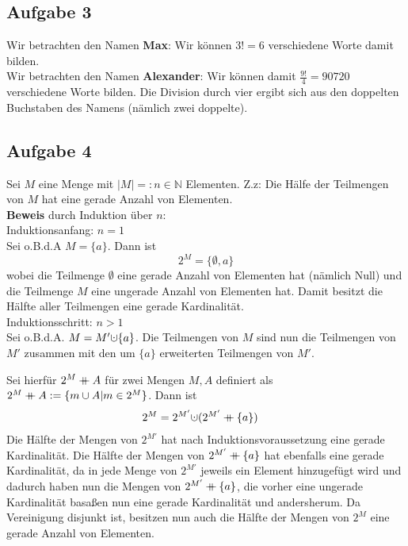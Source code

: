 \documentclass[11pt,a4paper,ngerman]{article}
\newcommand\mdoubleplus{\ensuremath{\mathbin{+\mkern-10mu+}}}
\begin{document}
\subsection*{Aufgabe 3}

Wir betrachten den Namen \textbf{Max}: Wir können $3! = 6$ verschiedene Worte damit bilden.\\
Wir betrachten den Namen \textbf{Alexander}: Wir können damit $\frac{9!}{4} = 90720$ verschiedene Worte bilden. Die Division durch vier ergibt sich aus den doppelten Buchstaben des Namens (nämlich zwei doppelte).

\subsection*{Aufgabe 4}
Sei $M$ eine Menge mit $|M| =: n \in \mathbb{N}$ Elementen. Z.z: Die Hälfe der Teilmengen von $M$ hat eine gerade Anzahl von Elementen. \\
\textbf{Beweis} durch Induktion über $n$: \\
  Induktionsanfang: $n = 1$ \\
        Sei o.B.d.A $M = \{ a \}$. Dann ist
        \begin{equation*}
          2^M = \{\emptyset, {a} \}
        \end{equation*}
        wobei die Teilmenge $\emptyset$ eine gerade Anzahl von Elementen hat (nämlich Null) und
        die Teilmenge $M$ eine ungerade Anzahl von Elementen hat. Damit besitzt die Hälfte aller
        Teilmengen eine gerade Kardinalität. \\
        Induktionsschritt: $n > 1$ \\
        Sei o.B.d.A. $M = M' \mathaccent\cdot\cup \{ a \}$.
        Die Teilmengen von $M$ sind nun die Teilmengen von $M'$ zusammen mit den um $\{a\}$ 
        erweiterten Teilmengen von $M'$.
        
        Sei hierfür $2^M \mdoubleplus A$ für zwei Mengen $M,A$ definiert als
        $2^M \mdoubleplus A := \{m \cup A | m \in 2^M\} $. Dann ist
        \begin{equation*}\begin{split}
          2^M &= 2^{M'} \mathaccent\cdot\cup (2^{M'} \mdoubleplus \{a\})
        \end{split}\end{equation*}
        Die Hälfte der Mengen von $2^{M'}$ hat nach Induktionsvoraussetzung eine gerade
        Kardinalität. Die Hälfte der Mengen von $2^{M'} \mdoubleplus \{a\}$ hat ebenfalls
        eine gerade Kardinalität, da in jede Menge von $2^{M'}$ jeweils ein Element hinzugefügt
        wird und dadurch haben nun die Mengen von $2^{M'} \mdoubleplus \{a\}$,
        die vorher eine ungerade Kardinalität basaßen nun eine
        gerade Kardinalität und andersherum. Da Vereinigung disjunkt ist, 
        besitzen nun auch die Hälfte der Mengen von $2^M$ eine gerade Anzahl von Elementen.

\label{LastPage}
\end{document}
